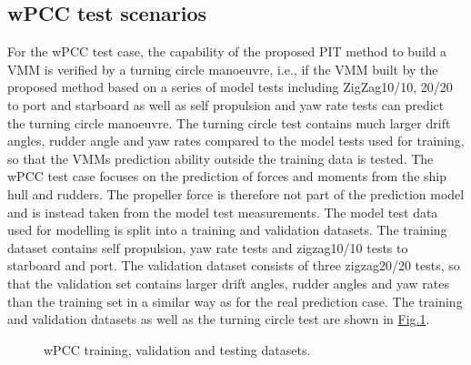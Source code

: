 \documentclass[review]{elsarticle}
\begin{document}
\subsection{wPCC test scenarios}
\label{\detokenize{05.01_case_studies:wpcc-test-scenarios}}
\sphinxAtStartPar
For the wPCC test case, the capability of the proposed PIT method to build a VMM is verified by a turning circle manoeuvre, i.e., if the VMM built by the proposed method based on a series of model tests including ZigZag10/10, 20/20 to port and starboard as well as self propulsion and yaw rate tests can predict the turning circle manoeuvre. The turning circle test contains much larger drift angles, rudder angle and yaw rates compared to the model tests used for training, so that the VMMs prediction ability outside the training data is tested.
The wPCC test case focuses on the prediction of forces and moments from the ship hull and rudders. The propeller force is therefore not part of the prediction model and is instead taken from the model test measurements.
The model test data used for modelling is split into a training and validation datasets. The training dataset contains self propulsion, yaw rate tests and zigzag10/10 tests to starboard and port. The validation dataset consists of three zigzag20/20 tests, so that the validation set contains larger drift angles, rudder angles and yaw rates than the training set in a similar way as for the real prediction case. The training and validation datasets as well as the turning circle test are shown in \hyperref[\detokenize{05.01_case_studies:fig-traintest}]{Fig.\@ \ref{\detokenize{05.01_case_studies:fig-traintest}}}.

\begin{figure}[H]
\centering
\capstart

\noindent{}
\caption{wPCC training, validation and testing datasets.}\label{\detokenize{05.01_case_studies:fig-traintest}}\end{figure}
\end{document}
